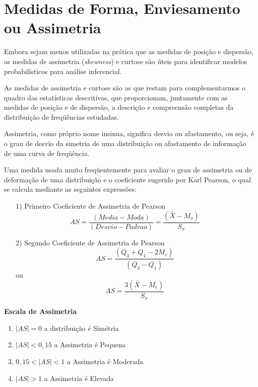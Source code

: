 \section{Medidas de Forma, Enviesamento ou Assimetria }

\inic Embora sejam menos utilizadas na prática que as medidas de posição e
dispersão, as medidas de assimetria (\textit{skewness}) e curtose são úteis para
identificar modelos probabilísticos para análise inferencial.

\inic As medidas de assimetria e curtose são as que restam para complementarmos o quadro das estatísticas descritivas, que proporcionam, juntamente com as medidas de posição e de dispersão, a descrição e compreensão completas da distribuição de freqüências estudadas.\vskip0.3cm

Assimetria, como próprio nome insinua, significa desvio ou afastamento, ou seja, é o grau de desvio da simetria de uma distribuição ou afastamento de informação de uma curva de freqüência.\vskip0.3cm





Uma medida usada muito freqüentemente para avaliar o grau de assimetria ou de deformação de uma distribuição e o coeficiente sugerido por Karl Pearson, o qual se calcula mediante as seguintes expressões:

\begin{enumerate}
  \item [{1)}]Primeiro Coeficiente de Assimetria de Pearson
  \begin{equation}\label{assimetria}
    AS= \frac{(Media-Moda)}{(Desvio-Padrao)} =\frac{(\bar{X}-M_{o})}{S_{x}}
\end{equation}
  \item [{2)}]Segundo Coeficiente de Assimetria de Pearson
  \begin{equation}\label{assimetria}
    AS= \frac{(Q_{3}+Q_{1}-2M_{e})}{(Q_{3}-Q_{1})}
\end{equation}
    ou
 \begin{equation}
    AS = \frac{3(\bar{X}-M_{e})}{S_{x}}
\end{equation}
\end{enumerate}






\textbf{Escala de Assimetria}

\begin{enumerate}
\item $|AS| =0$ a distribuição é Simétria
\item $|AS| < 0,15$ a Assimetria é Pequena
\item $0,15 < |AS| <1$ a Assimetria é Moderada
\item $|AS| > 1$ a Assimetria é Elevada
\end{enumerate}



